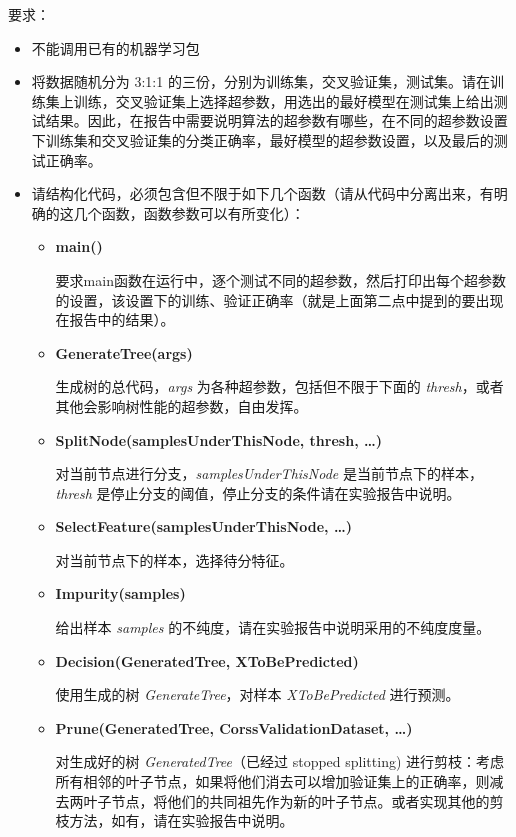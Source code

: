 \documentclass{article}
\begin{document}
要求：
\begin{itemize}
  \item 不能调用已有的机器学习包
  \item 将数据随机分为 3:1:1 的三份，分别为训练集，交叉验证集，测试集。请在训练集上训练，交叉验证集上选择超参数，用选出的最好模型在测试集上给出测试结果。因此，在报告中需要说明算法的超参数有哪些，在不同的超参数设置下训练集和交叉验证集的分类正确率，最好模型的超参数设置，以及最后的测试正确率。
  \item 请结构化代码，必须包含但不限于如下几个函数（请从代码中分离出来，有明确的这几个函数，函数参数可以有所变化）：
  \begin{itemize}
    \item \textbf{main()}

      要求main函数在运行中，逐个测试不同的超参数，然后打印出每个超参数的设置，该设置下的训练、验证正确率（就是上面第二点中提到的要出现在报告中的结果）。

    \item \textbf{GenerateTree(args)}

        生成树的总代码，\emph{args} 为各种超参数，包括但不限于下面的 \emph{thresh}，或者其他会影响树性能的超参数，自由发挥。

    \item \textbf{SplitNode(samplesUnderThisNode, thresh, \dots)}

        对当前节点进行分支，\emph{samplesUnderThisNode} 是当前节点下的样本，\emph{thresh} 是停止分支的阈值，停止分支的条件请在实验报告中说明。

    \item \textbf{SelectFeature(samplesUnderThisNode, \dots)}

        对当前节点下的样本，选择待分特征。

    \item \textbf{Impurity(samples)}

        给出样本 \emph{samples} 的不纯度，请在实验报告中说明采用的不纯度度量。

    \item \textbf{Decision(GeneratedTree, XToBePredicted)}

        使用生成的树 \emph{GenerateTree}，对样本 \emph{XToBePredicted} 进行预测。

    \item \textbf{Prune(GeneratedTree, CorssValidationDataset, \dots)}

        对生成好的树 \emph{GeneratedTree}（已经过 stopped splitting) 进行剪枝：考虑所有相邻的叶子节点，如果将他们消去可以增加验证集上的正确率，则减去两叶子节点，将他们的共同祖先作为新的叶子节点。或者实现其他的剪枝方法，如有，请在实验报告中说明。

  \end{itemize}

\end{itemize}
\end{document}
